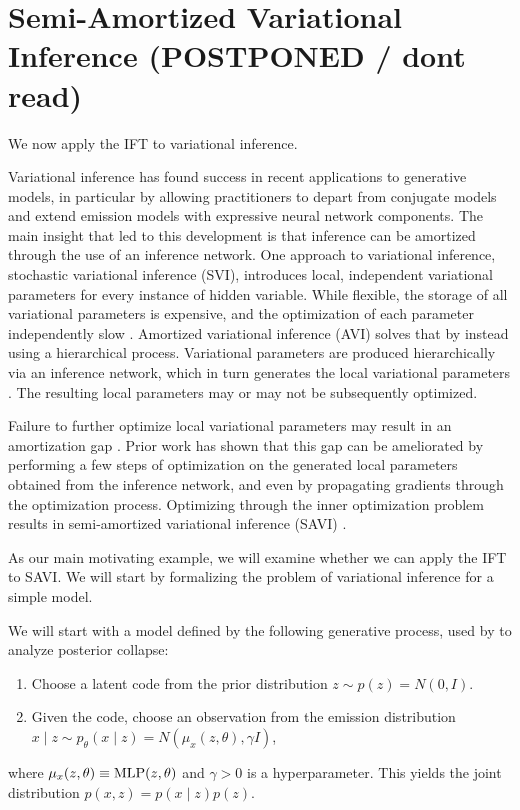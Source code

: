 \documentclass[11pt]{article}
\begin{document}
\section{Semi-Amortized Variational Inference (POSTPONED / dont read)}
We now apply the IFT to variational inference.

Variational inference has found success in recent applications to generative models,
in particular by allowing practitioners to depart from conjugate models
and extend emission models with expressive neural network components.
The main insight that led to this development is that inference can be amortized through
the use of an inference network.
One approach to variational inference, stochastic variational inference (SVI),
introduces local, independent variational parameters for every instance of hidden variable.
While flexible, the storage of all variational parameters is expensive, and the optimization
of each parameter independently slow \citep{}.
Amortized variational inference (AVI) solves that by instead using a hierarchical process.
Variational parameters are produced hierarchically via an inference network,
which in turn generates the local variational parameters \citep{}.
The resulting local parameters may or may not be subsequently optimized.

Failure to further optimize local variational parameters may result in an amortization gap \citep{}.
Prior work has shown that this gap can be ameliorated by performing a few steps of
optimization on the generated local parameters obtained from the inference network,
and even by propagating gradients through the optimization process.
Optimizing through the inner optimization problem results in semi-amortized variational inference
(SAVI) \citep{}.

As our main motivating example, we will examine whether we can apply the IFT to SAVI.
We will start by formalizing the problem of variational inference for a simple model.

We will start with a model defined by the following generative process,
used by \citet{dai2020vae} to analyze posterior collapse:
\begin{enumerate}
\item Choose a latent code from the prior distribution $z \sim p(z) = N(0, I)$.
\item Given the code, choose an observation from the emission distribution
    $x \mid z \sim p_\theta(x \mid z) = N(\mu_x(z, \theta), \gamma I)$,
\end{enumerate}
where $\mu_x(z, \theta) \equiv \mathrm{MLP}(z, \theta)$ and $\gamma > 0$ is a hyperparameter.
This yields the joint distribution $p(x,z) = p(x\mid z)p(z)$.
\end{document}
